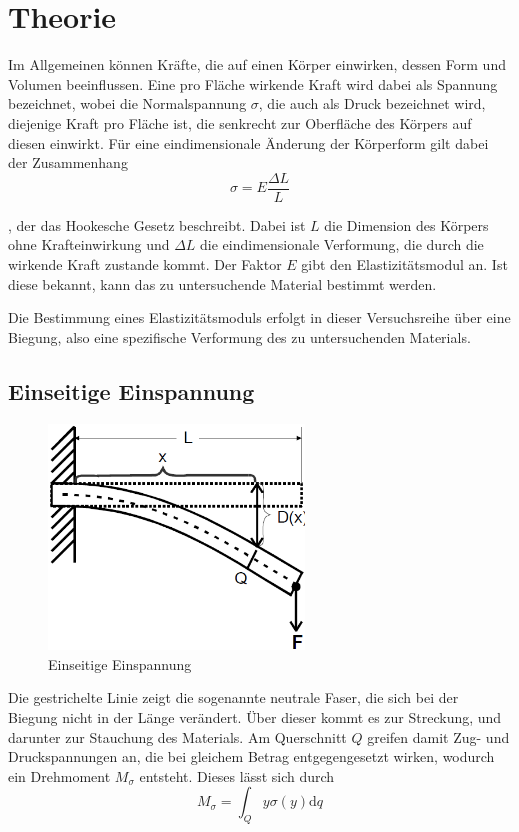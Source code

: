 \section{Theorie}
\label{sec:Theorie}

Im Allgemeinen können Kräfte, die auf einen Körper einwirken, dessen Form und Volumen beeinflussen. 
Eine pro Fläche wirkende Kraft wird dabei als Spannung bezeichnet, wobei die Normalspannung $\sigma$, die auch als Druck bezeichnet wird,
diejenige Kraft pro Fläche ist, die senkrecht zur Oberfläche des Körpers auf diesen einwirkt. Für eine eindimensionale Änderung der
Körperform gilt dabei der Zusammenhang \begin{equation}
    \sigma = E \frac{\Delta L}L
\end{equation}

, der das Hookesche Gesetz beschreibt. Dabei ist $L$ die Dimension des Körpers ohne Krafteinwirkung und $\Delta L$ die eindimensionale
Verformung, die durch die wirkende Kraft zustande kommt. Der Faktor $E$ gibt den Elastizitätsmodul an. Ist diese bekannt, kann das zu 
untersuchende Material bestimmt werden. 

Die Bestimmung eines Elastizitätsmoduls erfolgt in dieser Versuchsreihe über eine Biegung, also eine spezifische Verformung des zu 
untersuchenden Materials. 

\subsection{Einseitige Einspannung}

\begin{figure}
    \centering
    \includegraphics[height=6cm]{data/bild_1}
    \caption{Einseitige Einspannung}
\end{figure}

Die gestrichelte Linie zeigt die sogenannte neutrale Faser, die sich bei der Biegung nicht in der Länge verändert. 
Über dieser kommt es zur Streckung, und darunter zur Stauchung des Materials. Am Querschnitt $Q$ greifen damit Zug- und Druckspannungen
an, die bei gleichem Betrag entgegengesetzt wirken, wodurch ein Drehmoment $M_{\sigma}$ entsteht. Dieses lässt sich durch \begin{equation}
    M_{\sigma} = \int_Q y\sigma(y)\text{d}q
\end{equation}

